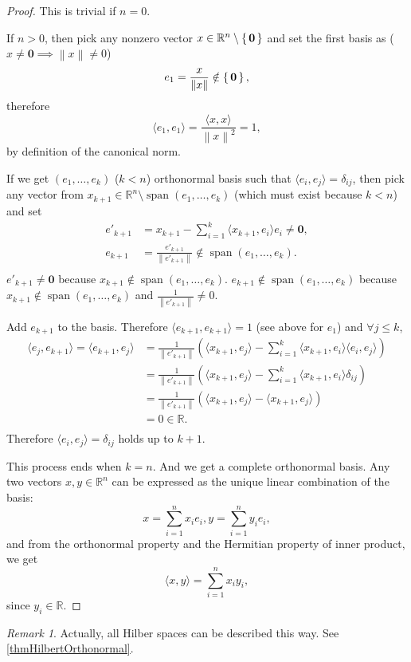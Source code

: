 \documentclass[12pt, letterpaper]{article}
\newcommand{\re}{\mathbb{R}}
\newcommand{\norm}[1]{\left\lVert #1 \right\rVert}
\theoremstyle{definition}
\theoremstyle{remark}
\newtheorem*{rem*}{Remark}
\theoremstyle{definition}
\theoremstyle{plain}
\numberwithin{equation}{section}
\begin{document}
	\begin{proof}
		This is trivial if $n=0$.
		
		If $n>0$, then pick any nonzero vector $x\in\re^n\setminus\set{\boldsymbol{0}}$ and set the first basis
		as ($x\ne\boldsymbol{0}\implies\norm{x}\ne0 $)
		\[e_1=\frac{x}{\norm{x}}\notin\set{\boldsymbol{0}}, \]
		therefore \[\langle e_1,e_1\rangle = \frac{\langle x,x\rangle}{\norm{x}^2}=1,\]
		by definition of the canonical norm.
		
		If we get $(e_1,\dots,e_k)$ ($k<n$)
		orthonormal basis such that $\langle e_i,e_j\rangle=\delta_{ij}$,
		then pick any vector from $x_{k+1}\in\re^n\setminus\operatorname{span}(e_1,\dots,e_k)$
		(which must exist because $k<n$)
		and set
		\[\begin{aligned}
			e'_{k+1}&=x_{k+1}-\sum_{i=1}^{k}\langle x_{k+1},e_i\rangle e_i\ne\boldsymbol{0},\\
			e_{k+1}&=\frac{e'_{k+1}}{\norm{e'_{k+1}}}\notin\operatorname{span}(e_1,\dots,e_k).\\
		\end{aligned}\]
		$e'_{k+1}\ne\boldsymbol{0}$ 
		because $x_{k+1}\notin\operatorname{span}(e_1,\dots,e_k)$.
		$e_{k+1}\notin\operatorname{span}(e_1,\dots,e_k)$
		because $x_{k+1}\notin\operatorname{span}(e_1,\dots,e_k)$ and $\frac{1}{\norm{e'_{k+1}}}
		\ne0$.
		
		Add $e_{k+1}$ to the basis.
		Therefore $\langle e_{k+1},e_{k+1}\rangle=1$ (see above for $e_1$) and
		$\forall j \le k$,
		\[\begin{aligned}
			\langle e_j,e_{k+1}\rangle=\langle e_{k+1},e_{j}\rangle&= \frac{1}{\norm{e'_{k+1}}}\left( \langle
			x_{k+1},e_j\rangle - \sum_{i=1}^{k}\langle x_{k+1},e_i\rangle \langle e_i,e_j\rangle\right)\\
			&=\frac{1}{\norm{e'_{k+1}}}\left( \langle
			x_{k+1},e_j\rangle - \sum_{i=1}^{k}\langle x_{k+1},e_i\rangle \delta_{ij}\right)\\
			&=\frac{1}{\norm{e'_{k+1}}}\left( \langle
			x_{k+1},e_j\rangle - \langle x_{k+1},e_j\rangle \right)\\
			&=0\in \re.\\
		\end{aligned} \]
		Therefore  $\langle e_i,e_j\rangle=\delta_{ij}$ holds up to $k+1$.
		
		This process ends when $k=n$. And we get a complete orthonormal basis.
		Any two vectors $x,y\in\re^n$ can be expressed as the unique linear combination of the basis:
		\[x=\sum_{i=1}^{n}x_ie_i,y=\sum_{i=1}^{n}y_ie_i, \]
		and from the orthonormal property and the Hermitian property of inner product, we get
		\[\langle x,y\rangle = \sum_{i=1}^n x_iy_i,\]
		since $y_i\in \re$.
	\end{proof}
	\begin{rem*}
		Actually, all Hilber spaces can be described this way.
		See \autoref{thmHilbertOrthonormal}.
	\end{rem*}
\end{document}

